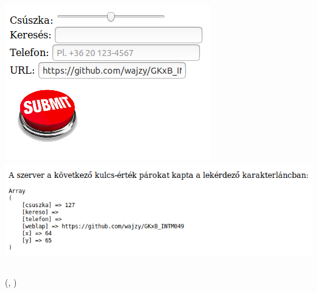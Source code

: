 \begin{frame}
  \begin{columns}[T]
      \includegraphics[width=\textwidth]{urlap6-1.png}
      \includegraphics[width=\textwidth]{urlap6-2.png}
  \end{columns}
\end{frame}

\begin{frame}
  \begin{exampleblock}{ 
  (, )}
    \footnotesize
    
  \end{exampleblock}
\end{frame}

